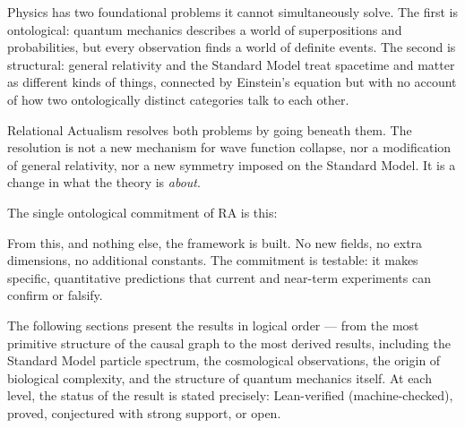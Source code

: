 \documentclass[11pt,a4paper]{article}
\begin{document}
Physics has two foundational problems it cannot simultaneously solve. The
first is ontological: quantum mechanics describes a world of superpositions and
probabilities, but every observation finds a world of definite events.
The second is structural: general relativity and the Standard Model treat
spacetime and matter as different kinds of things, connected by Einstein's
equation but with no account of how two ontologically distinct categories
talk to each other.

Relational Actualism resolves both problems by going beneath them. The resolution
is not a new mechanism for wave function collapse, nor a modification of
general relativity, nor a new symmetry imposed on the Standard Model.
It is a change in what the theory is \emph{about}.

The single ontological commitment of RA is this:

\medskip
\begin{center}
\end{center}
\medskip

From this, and nothing else, the framework is built. No new fields, no extra
dimensions, no additional constants. The commitment is testable: it makes
specific, quantitative predictions that current and near-term experiments can
confirm or falsify.

The following sections present the results in logical order --- from the most
primitive structure of the causal graph to the most derived results, including
the Standard Model particle spectrum, the cosmological observations, the origin
of biological complexity, and the structure of quantum mechanics itself.
At each level, the status of the result is stated precisely: Lean-verified
(machine-checked), proved, conjectured with strong support, or open.
\end{document}

